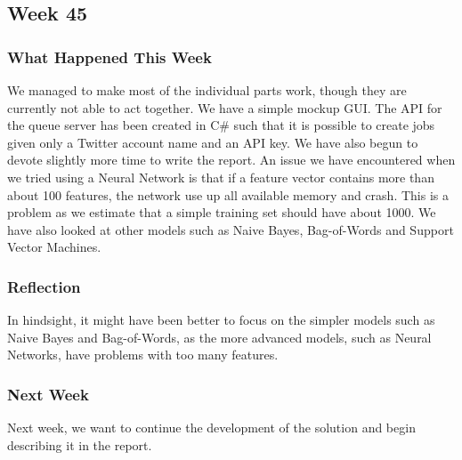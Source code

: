 \subsection{Week 45}
\subsubsection{What Happened This Week}
We managed to make most of the individual parts work, though they are currently
not able to act together. We have a simple mockup \ac{GUI}. The \ac{API}
for the queue server has been created in C\# such that it is possible to create
jobs given only a Twitter account name and an \ac{API} key. We have also begun
to devote slightly more time to write the report. An issue we have encountered when
we tried using a Neural Network is that if a feature vector contains more than
about 100 features, the network use up all available memory and crash. This is a
problem as we estimate that a simple training set should have about 1000. We
have also looked at other models such as Naive Bayes, Bag-of-Words and Support
Vector Machines.

\subsubsection{Reflection} 
In hindsight, it might have been better to focus on the simpler models such as
Naive Bayes and Bag-of-Words, as the more advanced models, such as Neural
Networks, have problems with too many features. 

\subsubsection{Next Week}
Next week, we want to continue the development of the solution and begin
describing it in the report.


